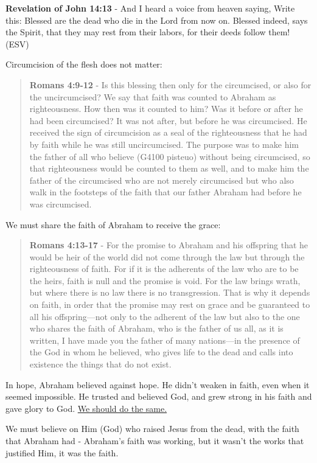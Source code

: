 \documentclass[11pt]{article}
\begin{document}
\textbf{Revelation of John 14:13} - And I heard a voice from heaven saying, Write this: Blessed are the dead who die in the Lord from now on. Blessed indeed, says the Spirit, that they may rest from their labors, for their deeds follow them! (ESV)

Circumcision of the flesh does not matter:

\begin{quote}
\textbf{Romans 4:9-12} - Is this blessing then only for the circumcised, or also for the uncircumcised? We say that faith was counted to Abraham as righteousness. How then was it counted to him? Was it before or after he had been circumcised? It was not after, but before he was circumcised. He received the sign of circumcision as a seal of the righteousness that he had by faith while he was still uncircumcised. The purpose was to make him the father of all who believe (G4100 pisteuo) without being circumcised, so that righteousness would be counted to them as well, and to make him the father of the circumcised who are not merely circumcised but who also walk in the footsteps of the faith that our father Abraham had before he was circumcised.
\end{quote}

We must share the faith of Abraham to receive the grace:

\begin{quote}
\textbf{Romans 4:13-17} - For the promise to Abraham and his offspring that he would be heir of the world did not come through the law but through the righteousness of faith. For if it is the adherents of the law who are to be the heirs, faith is null and the promise is void. For the law brings wrath, but where there is no law there is no transgression. That is why it depends on faith, in order that the promise may rest on grace and be guaranteed to all his offspring—not only to the adherent of the law but also to the one who shares the faith of Abraham, who is the father of us all, as it is written, I have made you the father of many nations—in the presence of the God in whom he believed, who gives life to the dead and calls into existence the things that do not exist.
\end{quote}

In hope, Abraham believed against hope. He didn't weaken in faith, even when it seemed impossible.
He trusted and believed God, and grew strong in his faith and gave glory to God. \uline{We should do the same.}

We must believe on Him (God) who raised Jesus from the dead, with the faith that Abraham had - Abraham's faith was working, but it wasn't the works that justified Him, it was the faith.
\end{document}
